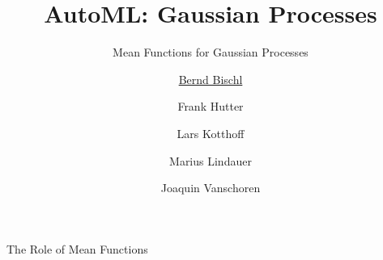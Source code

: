 



\newcommand{\lz}{\vspace{0.5cm}}
\newcommand{\thetab}{\bm{\weights}}
\newcommand{\zero}{\mathbf{0}}
\newcommand{\Xmat}{\mathbf{X}}
\newcommand{\ydat}{\mathbf{y}}
\newcommand{\id}{\boldsymbol{I}}
\newcommand{\Amat}{\mathbf{A}}
\newcommand{\Xspace}{\mathcal{X}}                                           
\newcommand{\Yspace}{\mathcal{Y}}
\newcommand{\ls}{\ell}
\newcommand{\natnum}{\mathbb{N}}
\newcommand{\intnum}{\mathbb{Z}}

\usepackage{fontawesome}
\usepackage{dirtytalk}
\usepackage{csquotes}



\title[AutoML: GPs]{AutoML: Gaussian Processes} %
\subtitle{Mean Functions for Gaussian Processes} %
\author[Marius Lindauer]{\underline{Bernd Bischl} \and Frank Hutter \and Lars Kotthoff\newline \and Marius Lindauer \and Joaquin Vanschoren}
\institute{}
\date{}





\maketitle
	


\begin{frame}[c,allowframebreaks]{The Role of Mean Functions}



\framebreak



\framebreak




\framebreak



\framebreak




\end{frame}



